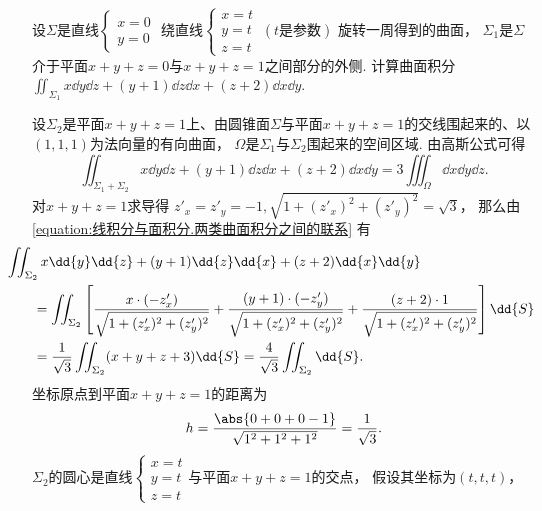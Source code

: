 \begin{example}
设\(\Sigma\)是直线\(\left\{ \begin{array}{l}
	x = 0 \\
	y = 0
\end{array} \right.\)
绕直线\(\left\{ \begin{array}{l}
	x = t \\
	y = t \\
	z = t
\end{array} \right.
\ (\text{$t$是参数})\)
旋转一周得到的曲面，
\(\Sigma_1\)是\(\Sigma\)介于平面\(x+y+z=0\)与\(x+y+z=1\)之间部分的外侧.
计算曲面积分\(\iint_{\Sigma_1} x \dd{y}\dd{z} + (y+1) \dd{z}\dd{x} + (z+2) \dd{x}\dd{y}\).
\begin{solution}
设\(\Sigma_2\)是平面\(x+y+z=1\)上、由圆锥面\(\Sigma\)与平面\(x+y+z=1\)的交线围起来的、以\((1,1,1)\)为法向量的有向曲面，
\(\Omega\)是\(\Sigma_1\)与\(\Sigma_2\)围起来的空间区域.
由高斯公式可得\begin{equation*}
	\iint_{\Sigma_1 + \Sigma_2} x \dd{y}\dd{z} + (y+1) \dd{z}\dd{x} + (z+2) \dd{x}\dd{y}
	= 3 \iiint_\Omega \dd{x}\dd{y}\dd{z}.
\end{equation*}
对\(x+y+z=1\)求导得
\(z'_x = z'_y = -1,
\sqrt{1+(z'_x)^2+(z'_y)^2}
= \sqrt3\)，
那么由\cref{equation:线积分与面积分.两类曲面积分之间的联系} 有\begin{align*}
	&\hspace{-20pt}
	\iint_{\Sigma_2} x \dd{y}\dd{z} + (y+1) \dd{z}\dd{x} + (z+2) \dd{x}\dd{y} \\
	&= \iint_{\Sigma_2} \left[
		\frac{x \cdot (-z'_x)}{\sqrt{1+(z'_x)^2+(z'_y)^2}}
		+ \frac{(y+1) \cdot (-z'_y)}{\sqrt{1+(z'_x)^2+(z'_y)^2}}
		+ \frac{(z+2) \cdot 1}{\sqrt{1+(z'_x)^2+(z'_y)^2}}
	\right] \dd{S} \\
	&= \frac1{\sqrt3} \iint_{\Sigma_2} (x+y+z+3) \dd{S}
	= \frac4{\sqrt3} \iint_{\Sigma_2} \dd{S}.
\end{align*}
坐标原点到平面\(x+y+z=1\)的距离为\begin{equation*}
	h
	= \frac{\abs{0+0+0-1}}{\sqrt{1^2+1^2+1^2}}
	= \frac1{\sqrt3}.
\end{equation*}
\(\Sigma_2\)的圆心是直线\(\left\{ \begin{array}{l}
	x = t \\
	y = t \\
	z = t
\end{array} \right.\)与平面\(x+y+z=1\)的交点，
假设其坐标为\((t,t,t)\)，

\end{solution}
\end{example}
